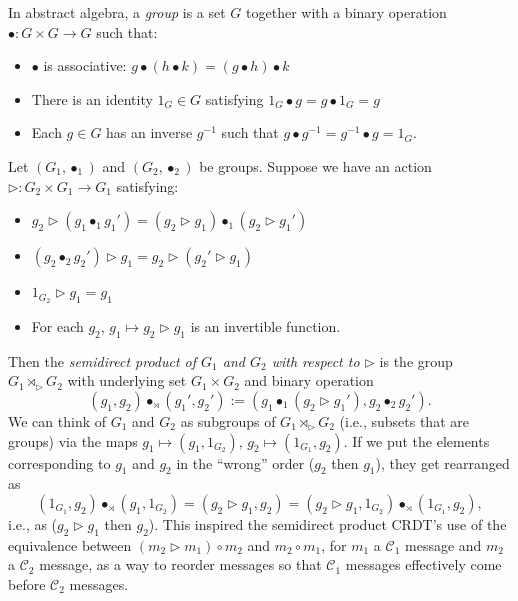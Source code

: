 \documentclass[acmsmall,nonacm]{acmart}
\newcommand{\mc}[1]{\ensuremath{\mathcal{#1}}}
\newcommand{\ra}{\rightarrow}
\newcommand{\act}{\triangleright}
\theoremstyle{plain}
\theoremstyle{definition}
\newtheorem{myrmk}[mythm]{Remark}
\begin{document}
In abstract algebra, a \textit{group} is a set $G$ together with a binary operation $\bullet: G \times G \ra G$ such that:
\begin{itemize}
  \renewcommand\labelitemi{--}
  \item $\bullet$ is associative: $g \bullet (h \bullet k) = (g \bullet h) \bullet k$
  \item There is an identity $1_G \in G$ satisfying $1_G \bullet g = g \bullet 1_G = g$
  \item Each $g \in G$ has an inverse $g^{-1}$ such that $g \bullet g^{-1} = g^{-1} \bullet g = 1_G$.
\end{itemize}
Let $(G_1, \bullet_1)$ and $(G_2, \bullet_2)$ be groups.  Suppose we have an action $\act: G_2 \times G_1 \ra G_1$ satisfying:
\begin{itemize}
  \renewcommand\labelitemi{--}
  \item $g_2 \act (g_1 \bullet_1 g_1') = (g_2 \act g_1) \bullet_1 (g_2 \act g_1')$
  \item $(g_2 \bullet_2 g_2') \act g_1 = g_2 \act (g_2' \act g_1)$
  \item $1_{G_2} \act g_1 = g_1$
  \item For each $g_2$, $g_1 \mapsto g_2 \act g_1$ is an invertible function.
\end{itemize}
Then the \textit{semidirect product of $G_1$ and $G_2$ with respect to $\act$} is the group $G_1 \rtimes_\act G_2$ with underlying set $G_1 \times G_2$ and binary operation \cite[\S 5.5]{dummit_foote}
\[
(g_1, g_2) \bullet_\rtimes (g_1', g_2') := (g_1 \bullet_1 (g_2 \act g_1'), g_2 \bullet_2 g_2').
\]
We can think of $G_1$ and $G_2$ as subgroups of $G_1 \rtimes_\act G_2$ (i.e., subsets that are groups) via the maps $g_1 \mapsto (g_1, 1_{G_2})$, $g_2 \mapsto (1_{G_1}, g_2)$.  If we put the elements corresponding to $g_1$ and $g_2$ in the ``wrong'' order ($g_2$ then $g_1$), they get rearranged as
\[
(1_{G_1}, g_2) \bullet_\rtimes (g_1, 1_{G_2}) = (g_2 \act g_1, g_2) = (g_2 \act g_1, 1_{G_2}) \bullet_\rtimes (1_{G_1}, g_2),
\]
i.e., as ($g_2 \act g_1$ then $g_2$).  This inspired the semidirect product CRDT's use of the equivalence between $(m_2 \act m_1) \circ m_2$ and $m_2 \circ m_1$, for $m_1$ a $\mc{C}_1$ message and $m_2$ a $\mc{C}_2$ message, as a way to reorder messages so that $\mc{C}_1$ messages effectively come before $\mc{C}_2$ messages.

\end{document}
